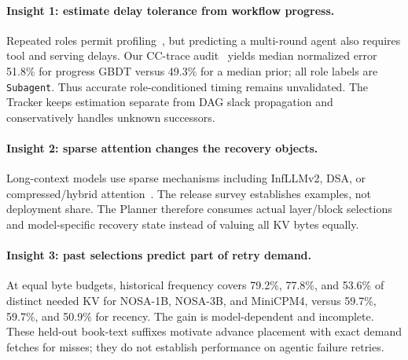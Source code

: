\paragraph{Insight 1: estimate delay tolerance from workflow progress.}
Repeated roles permit profiling~\cite{yu2026pythia}, but predicting a
multi-round agent also requires tool and serving delays. Our CC-trace
audit~\cite{semianalysis2026cctraces} yields median normalized error
51.8\% for progress GBDT versus 49.3\% for a median prior; all role labels
are \texttt{Subagent}. Thus accurate role-conditioned timing remains
unvalidated. The Tracker keeps estimation separate from DAG slack
propagation and conservatively handles unknown successors.

\paragraph{Insight 2: sparse attention changes the recovery objects.}
Long-context models use sparse mechanisms including InfLLMv2,
DSA, or compressed/hybrid attention~\cite{minicpm4model,
openbmb2025minicpm41,deepseek2025v32exp,deepseek2025v32model,
zai2026glm5model,openbmb2026sala,deepseek2026v4model,minimax2026m3,
zai2026glm52,longcat2026sparse}.
The release survey establishes examples, not deployment share.
The Planner therefore consumes actual layer/block selections and
model-specific recovery state instead of valuing all KV bytes equally.

\paragraph{Insight 3: past selections predict part of retry demand.}
At equal byte budgets, historical frequency covers 79.2\%, 77.8\%, and
53.6\% of distinct needed KV for NOSA-1B, NOSA-3B, and MiniCPM4,
versus 59.7\%, 59.7\%, and 50.9\% for recency. The gain is
model-dependent and incomplete. These held-out book-text suffixes
motivate advance placement with exact demand fetches for misses;
they do not establish performance on agentic failure retries.

